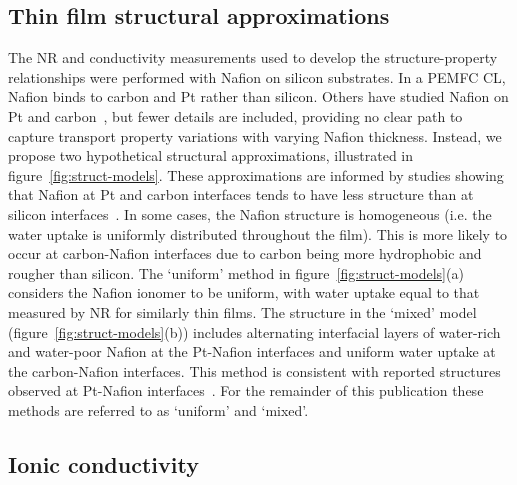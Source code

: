 \documentclass[final,3p,times,twocolumn]{elsarticle}    %
\begin{document}
\subsection{Thin film structural approximations}

The NR and conductivity measurements used to develop the structure-property relationships were performed with Nafion on silicon substrates. In a PEMFC CL, Nafion binds to carbon and Pt rather than silicon. Others have studied Nafion on Pt and carbon~\cite{bib:wood_2009, bib:shrivastava_2018, bib:dura_2009, bib:ito_2020}, but fewer details are included, providing no clear path to capture transport property variations with varying Nafion thickness. Instead, we propose two hypothetical structural approximations, illustrated in figure~\ref{fig:struct-models}. These approximations are informed by studies showing that Nafion at Pt and carbon interfaces tends to have less structure than at silicon interfaces~\cite{bib:wood_2009, bib:ito_2020, bib:dura_2009, bib:shrivastava_2018}. In some cases, the Nafion structure is homogeneous (i.e. the water uptake is uniformly distributed throughout the film). This is more likely to occur at carbon-Nafion interfaces due to carbon being more hydrophobic and rougher than silicon. The `uniform' method in figure~\ref{fig:struct-models}(a) considers the Nafion ionomer to be uniform, with water uptake equal to that measured by NR for similarly thin films. The structure in the `mixed' model (figure~\ref{fig:struct-models}(b)) includes alternating interfacial layers of water-rich and water-poor Nafion at the Pt-Nafion interfaces and uniform water uptake at the carbon-Nafion interfaces. This method is consistent with reported structures observed at Pt-Nafion interfaces~\cite{bib:wood_2009, bib:dura_2009, bib:shrivastava_2018}. For the remainder of this publication these methods are referred to as `uniform' and `mixed'.

\subsection{Ionic conductivity}
\label{sect:ionic-conductivity}
\end{document}
